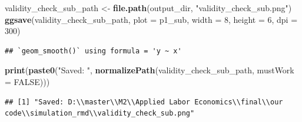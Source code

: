 \documentclass[
]{article}
\newenvironment{Shaded}{\begin{snugshade}}{\end{snugshade}}
\newcommand{\AttributeTok}[1]{\textcolor[rgb]{0.13,0.29,0.53}{#1}}
\newcommand{\ConstantTok}[1]{\textcolor[rgb]{0.56,0.35,0.01}{#1}}
\newcommand{\DecValTok}[1]{\textcolor[rgb]{0.00,0.00,0.81}{#1}}
\newcommand{\FunctionTok}[1]{\textcolor[rgb]{0.13,0.29,0.53}{\textbf{#1}}}
\newcommand{\NormalTok}[1]{#1}
\newcommand{\OtherTok}[1]{\textcolor[rgb]{0.56,0.35,0.01}{#1}}
\newcommand{\StringTok}[1]{\textcolor[rgb]{0.31,0.60,0.02}{#1}}
\begin{document}
\begin{Shaded}
\begin{Highlighting}[]
\NormalTok{validity\_check\_sub\_path }\OtherTok{\textless{}{-}} \FunctionTok{file.path}\NormalTok{(output\_dir, }\StringTok{"validity\_check\_sub.png"}\NormalTok{)}
\FunctionTok{ggsave}\NormalTok{(validity\_check\_sub\_path, }\AttributeTok{plot =}\NormalTok{ p1\_sub, }\AttributeTok{width =} \DecValTok{8}\NormalTok{, }\AttributeTok{height =} \DecValTok{6}\NormalTok{, }\AttributeTok{dpi =} \DecValTok{300}\NormalTok{)}
\end{Highlighting}
\end{Shaded}

\begin{verbatim}
## `geom_smooth()` using formula = 'y ~ x'
\end{verbatim}

\begin{Shaded}
\begin{Highlighting}[]
\FunctionTok{print}\NormalTok{(}\FunctionTok{paste0}\NormalTok{(}\StringTok{"Saved: "}\NormalTok{, }\FunctionTok{normalizePath}\NormalTok{(validity\_check\_sub\_path, }\AttributeTok{mustWork =} \ConstantTok{FALSE}\NormalTok{)))}
\end{Highlighting}
\end{Shaded}

\begin{verbatim}
## [1] "Saved: D:\\master\\M2\\Applied Labor Economics\\final\\our code\\simulation_rmd\\validity_check_sub.png"
\end{verbatim}
\end{document}
